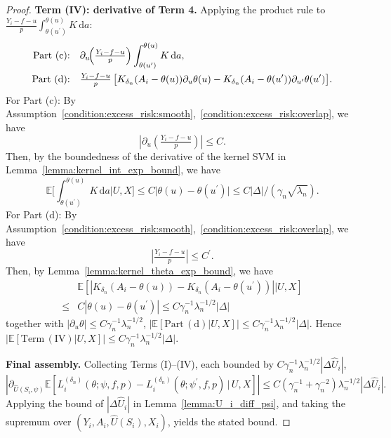 \documentclass[12pt]{article}
\newcommand{\E}{\mathbb{E}}
\begin{document}
\begin{proof}
\noindent\textbf{Term (IV): derivative of Term 4.}
Applying the product rule to $\tfrac{Y_i-f-u}{p}\int_{\theta(u^\prime)}^{\theta(u)}K\,\mathrm{d}a$:
\begin{align*}
\text{Part (c):}&\quad\partial_u\!\Bigl(\tfrac{Y_i-f-u}{p}\Bigr)\int_{\theta(u^\prime)}^{\theta(u)}K\,\mathrm{d}a,\\
\text{Part (d):}&\quad\tfrac{Y_i-f-u}{p}\,\bigl[K_{\delta_n}(A_i-\theta(u))\partial_u\theta(u)-K_{\delta_n}(A_i-\theta(u^\prime))\partial_{u^\prime}\theta(u^\prime)\bigr].
\end{align*}
For Part (c): By Assumption~\ref{condition:excess_risk:smooth},~\ref{condition:excess_risk:overlap}, we have 
$$|\partial_u(\tfrac{Y_i-f-u}{p})|\leq C.$$
Then, by the boundedness of the derivative of the kernel SVM in Lemma~\ref{lemma:kernel_int_exp_bound}, we have $$\E[\int_{\theta(u^\prime)}^{\theta(u)}K\,\mathrm{d}a|U,X]\leq C|\theta(u)-\theta(u^\prime)|\leq C|\Delta|/(\gamma_n\sqrt{\lambda_n}).$$
For Part (d): By Assumption~\ref{condition:excess_risk:smooth},~\ref{condition:excess_risk:overlap}, we have
$$|\tfrac{Y_i-f-u}{p}|\leq C^\prime.$$ 
Then, by Lemma~\ref{lemma:kernel_theta_exp_bound}, we have
\begin{align*}
    &\E[|K_{\delta_n}(A_i-\theta(u))-K_{\delta_n}(A_i-\theta(u^\prime))||U,X]\\
    \leq & C|\theta(u)-\theta(u^\prime)|\leq C\gamma_n^{-1}\lambda_n^{-1/2}|\Delta|
\end{align*}
together with $|\partial_u\theta|\leq C\gamma_n^{-1}\lambda_n^{-1/2}$, $\left|\E[\mathrm{Part\,(d)}|U,X]\right|\leq C\gamma_n^{-1}\lambda_n^{-1/2}|\Delta|$.
Hence $\left|\E[\mathrm{Term\,(IV)}|U,X]\right|\leq C\gamma_n^{-1}\lambda_n^{-1/2}|\Delta|$.

\noindent\textbf{Final assembly.}
Collecting Terms (I)--(IV), each bounded by $C\gamma_n^{-1}\lambda_n^{-1/2}|\Delta\widehat{U}_i|$,
$$\left|\partial_{\widehat{U}(S_i,\psi)}\E\!\left[L^{(\delta_n)}_i(\theta;\psi,f,p)-L^{(\delta_n)}_i(\theta;\psi^\prime,f,p)\,\big|\,U,X\right]\right|\leq C(\gamma_n^{-1} +\gamma_n^{-2})\lambda_n^{-1/2}|\Delta\widehat{U}_i|.$$
Applying the bound of $|\Delta \widehat U_i|$ in  Lemma~\ref{lemma:U_i_diff_psi}, and taking the supremum over $(Y_i,A_i,\widehat{U}(S_i),X_i)$, yields the stated bound.
\end{proof}
\end{document}
